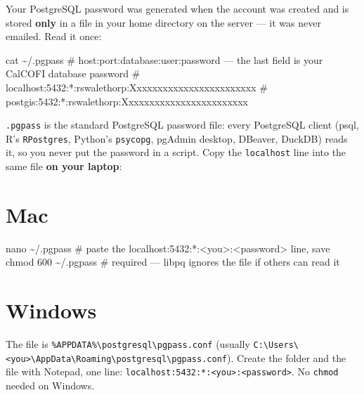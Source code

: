 \documentclass[
  letterpaper,
  DIV=11,
  numbers=noendperiod]{scrreprt}
\newenvironment{Shaded}{\begin{snugshade}}{\end{snugshade}}
\newcommand{\CommentTok}[1]{\textcolor[rgb]{0.37,0.37,0.37}{#1}}
\newcommand{\FunctionTok}[1]{\textcolor[rgb]{0.28,0.35,0.67}{#1}}
\newcommand{\NormalTok}[1]{\textcolor[rgb]{0.00,0.23,0.31}{#1}}
\begin{document}
Your PostgreSQL password was generated when the account was created and
is stored \textbf{only} in a file in your home directory on the server
--- it was never emailed. Read it once:

\begin{Shaded}
\begin{Highlighting}[]
\FunctionTok{cat}\NormalTok{ \textasciitilde{}/.pgpass}
\CommentTok{\# host:port:database:user:password — the last field is your CalCOFI database password}
\CommentTok{\# localhost:5432:*:rswalethorp:Xxxxxxxxxxxxxxxxxxxxxxxx}
\CommentTok{\# postgis:5432:*:rswalethorp:Xxxxxxxxxxxxxxxxxxxxxxxx}
\end{Highlighting}
\end{Shaded}

\texttt{.pgpass} is the standard PostgreSQL password file: every
PostgreSQL client (psql, R's \texttt{RPostgres}, Python's
\texttt{psycopg}, pgAdmin desktop, DBeaver, DuckDB) reads it, so you
never put the password in a script. Copy the \texttt{localhost} line
into the same file \textbf{on your laptop}:

\section{Mac}

\begin{Shaded}
\begin{Highlighting}[]
\FunctionTok{nano}\NormalTok{ \textasciitilde{}/.pgpass         }\CommentTok{\# paste the localhost:5432:*:\textless{}you\textgreater{}:\textless{}password\textgreater{} line, save}
\FunctionTok{chmod}\NormalTok{ 600 \textasciitilde{}/.pgpass    }\CommentTok{\# required — libpq ignores the file if others can read it}
\end{Highlighting}
\end{Shaded}

\section{Windows}

The file is
\texttt{\%APPDATA\%\textbackslash{}postgresql\textbackslash{}pgpass.conf}
(usually
\texttt{C:\textbackslash{}Users\textbackslash{}\textless{}you\textgreater{}\textbackslash{}AppData\textbackslash{}Roaming\textbackslash{}postgresql\textbackslash{}pgpass.conf}).
Create the folder and the file with Notepad, one line:
\texttt{localhost:5432:*:\textless{}you\textgreater{}:\textless{}password\textgreater{}}.
No \texttt{chmod} needed on Windows.
\end{document}
